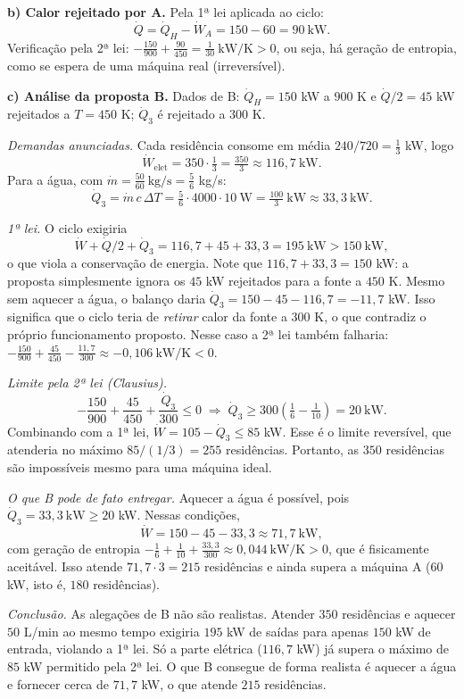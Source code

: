 \documentclass{article}%
\begin{document}
\textbf{b) Calor rejeitado por A.} Pela 1ª lei aplicada ao ciclo:
\[
\dot Q=\dot Q_H-\dot W_A=150-60=90\ \text{kW}.
\]
Verificação pela 2ª lei: $-\tfrac{150}{900}+\tfrac{90}{450}=\tfrac{1}{30}\ \text{kW/K}>0$, ou seja, há geração de entropia, como se espera de uma máquina real (irreversível).

\textbf{c) Análise da proposta B.}
Dados de B: $\dot Q_H=150$ kW a $900$ K e $\dot Q/2=45$ kW rejeitados a $T=450$ K; $\dot Q_3$ é rejeitado a $300$ K.

\emph{Demandas anunciadas.} Cada residência consome em média $240/720=\tfrac13$ kW, logo
\[
\dot W_{\text{elet}}=350\cdot\tfrac13=\tfrac{350}{3}\approx 116{,}7\ \text{kW}.
\]
Para a água, com $\dot m=\tfrac{50}{60}\ \text{kg/s}=\tfrac56$ kg/s:
\[
\dot Q_3=\dot m\,c\,\Delta T=\tfrac56\cdot 4000\cdot 10\ \text{W}=\tfrac{100}{3}\ \text{kW}\approx 33{,}3\ \text{kW}.
\]

\emph{1ª lei.} O ciclo exigiria
\[
\dot W+\dot Q/2+\dot Q_3=116{,}7+45+33{,}3=195\ \text{kW}>150\ \text{kW},
\]
o que viola a conservação de energia. Note que $116{,}7+33{,}3=150$ kW: a proposta simplesmente ignora os $45$ kW rejeitados para a fonte a $450$ K. Mesmo sem aquecer a água, o balanço daria $\dot Q_3=150-45-116{,}7=-11{,}7$ kW. Isso significa que o ciclo teria de \emph{retirar} calor da fonte a $300$ K, o que contradiz o próprio funcionamento proposto. Nesse caso a 2ª lei também falharia: $-\tfrac{150}{900}+\tfrac{45}{450}-\tfrac{11{,}7}{300}\approx-0{,}106\ \text{kW/K}<0$.

\emph{Limite pela 2ª lei (Clausius).}
\[
-\frac{150}{900}+\frac{45}{450}+\frac{\dot Q_3}{300}\le 0\;\Longrightarrow\;\dot Q_3\ge 300\left(\tfrac16-\tfrac1{10}\right)=20\ \text{kW}.
\]
Combinando com a 1ª lei, $\dot W=105-\dot Q_3\le 85$ kW. Esse é o limite reversível, que atenderia no máximo $85/(1/3)=255$ residências. Portanto, as $350$ residências são impossíveis mesmo para uma máquina ideal.

\emph{O que B pode de fato entregar.} Aquecer a água é possível, pois $\dot Q_3=33{,}3\ \text{kW}\ge 20$ kW. Nessas condições,
\[
\dot W=150-45-33{,}3\approx 71{,}7\ \text{kW},
\]
com geração de entropia $-\tfrac16+\tfrac1{10}+\tfrac{33{,}3}{300}\approx 0{,}044\ \text{kW/K}>0$, que é fisicamente aceitável. Isso atende $71{,}7\cdot 3=215$ residências e ainda supera a máquina A ($60$ kW, isto é, $180$ residências).

\emph{Conclusão.} As alegações de B não são realistas. Atender $350$ residências e aquecer $50$ L/min ao mesmo tempo exigiria $195$ kW de saídas para apenas $150$ kW de entrada, violando a 1ª lei. Só a parte elétrica ($116{,}7$ kW) já supera o máximo de $85$ kW permitido pela 2ª lei. O que B consegue de forma realista é aquecer a água e fornecer cerca de $71{,}7$ kW, o que atende $215$ residências.
\end{document}
